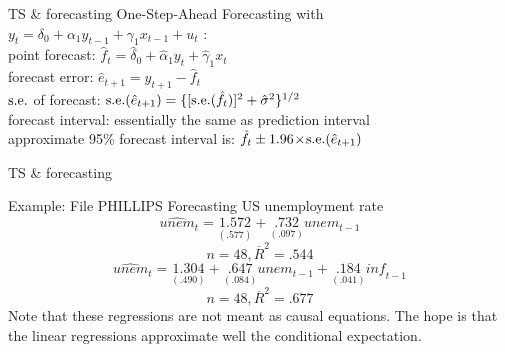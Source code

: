 \documentclass{beamer}
\begin{document}
\begin{frame}{TS \& forecasting}
One-Step-Ahead Forecasting with \\
\vspace{0.2cm}
$y_t=\delta_0+\alpha_1 y_{t-1} + \gamma_1 x_{t-1} + u_t $ :\\
\vspace{0.8cm}
point forecast: $\hat{f}_t = \hat{\delta}_0 + \hat{\alpha}_1 y_t + \hat{\gamma}_1 x_t$\\
\vspace{0.2cm}
forecast error: $\hat{e}_{t+1}=y_{t+1}-\hat{f}_t $\\
\vspace{0.2cm}
$\textnormal{s.e.}$ of forecast: $\textnormal{s.e.}(\hat{e}_{t+1})= \{ [\textnormal{s.e.} (\hat{f}_t)]^2+\hat{\sigma}^2\}^{1/2}$  \\
\vspace{0.82cm}
forecast interval: essentially the same as prediction interval \\
\vspace{0.2cm}
approximate 95\% forecast interval is:  $\hat{f}_t \pm 1.96 \! \times \! \textnormal{s.e.}(\hat{e}_{t+1})$
\end{frame}
\begin{frame}{TS \& forecasting}
\begin{block}{Example: File PHILLIPS}
Forecasting US unemployment rate
$$\widehat{\textit{unem}}_t = \underset{(.577)}{1.572} 
   + \underset{(.097)}{.732}\textit{unem}_{ t-1}$$
$$ n= 48, \overline{R}^2=.544$$
$$ \widehat{\textit{unem}}_t = \underset{(.490)}{1.304} + \underset{(.084)}{.647}\textit{unem}_{t-1}+\underset{(.041)}{.184} \textit{inf}_{t-1}$$
$$n=48,  \overline{R}^2=.677$$
Note that these regressions are not meant as causal equations. The hope is that the linear regressions approximate well the conditional expectation. 
\end{block}
\end{frame}
\end{document}
